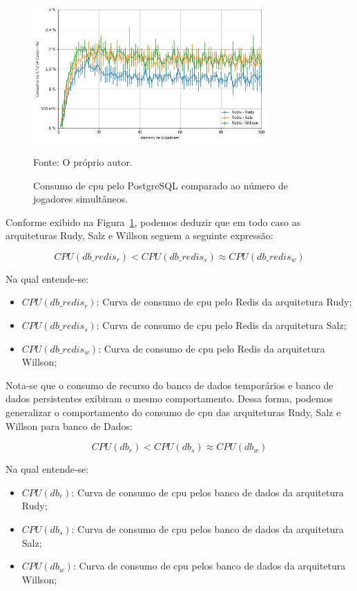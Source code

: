\begin{figure}[htb!]
  \caption{Consumo de \ac{cpu} pelo PostgreSQL comparado ao número de jogadores simultâneos.}
  \label{fig:cpu_redis_media_por_jogador}
  \includegraphics[width=0.8\textwidth]{figuras/analise/cpu_redis_media_por_jogador.png}
  \centering

  Fonte: O próprio autor.
\end{figure}

Conforme exibido na Figura~\ref{fig:cpu_redis_media_por_jogador}, podemos deduzir que em todo caso as arquiteturas Rudy, Salz e Willson seguem a seguinte expressão:

$$
    CPU(db\_redis_{r}) < CPU(db\_redis_{s}) \approx CPU(db\_redis_{w})
$$

Na qual entende-se:

\begin{itemize}
\item $CPU(db\_redis_{r})$: Curva de consumo de \ac{cpu} pelo Redis da arquitetura Rudy;
\item $CPU(db\_redis_{s})$: Curva de consumo de \ac{cpu} pelo Redis da arquitetura Salz;
\item $CPU(db\_redis_{w})$: Curva de consumo de \ac{cpu} pelo Redis da arquitetura Willson;
\end{itemize}

Nota-se que o consumo de recurso do banco de dados temporários e banco de dados persistentes exibiram o mesmo comportamento.
%
Dessa forma, podemos generalizar o comportamento do consumo de \ac{cpu} das arquiteturas Rudy, Salz e Willson para banco de Dados:

$$
    CPU(db_{r}) < CPU(db_{s}) \approx CPU(db_{w})
$$

Na qual entende-se:

\begin{itemize}
\item $CPU(db_{r})$: Curva de consumo de \ac{cpu} pelos banco de dados da arquitetura Rudy;
\item $CPU(db_{s})$: Curva de consumo de \ac{cpu} pelos banco de dados da arquitetura Salz;
\item $CPU(db_{w})$: Curva de consumo de \ac{cpu} pelos banco de dados da arquitetura Willson;
\end{itemize}

